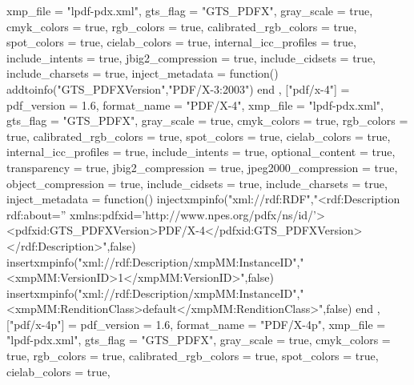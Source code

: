 {{            xmp_file                = "lpdf-pdx.xml",
            gts_flag                = "GTS_PDFX",
            gray_scale              = true,
            cmyk_colors             = true,
            rgb_colors              = true,
            calibrated_rgb_colors   = true,
            spot_colors             = true,
            cielab_colors           = true,
            internal_icc_profiles   = true,
            include_intents         = true,
            jbig2_compression       = true,
            include_cidsets         = true,
            include_charsets        = true,
            inject_metadata         = function()
                addtoinfo("GTS_PDFXVersion","PDF/X-3:2003")
            end
        },
        ["pdf/x-4"] = {
            pdf_version             = 1.6,
            format_name             = "PDF/X-4",
            xmp_file                = "lpdf-pdx.xml",
            gts_flag                = "GTS_PDFX",
            gray_scale              = true,
            cmyk_colors             = true,
            rgb_colors              = true,
            calibrated_rgb_colors   = true,
            spot_colors             = true,
            cielab_colors           = true,
            internal_icc_profiles   = true,
            include_intents         = true,
            optional_content        = true,
            transparency            = true,
            jbig2_compression       = true,
            jpeg2000_compression    = true,
            object_compression      = true,
            include_cidsets         = true,
            include_charsets        = true,
            inject_metadata         = function()
                injectxmpinfo("xml://rdf:RDF","<rdf:Description rdf:about='' xmlns:pdfxid='http://www.npes.org/pdfx/ns/id/'><pdfxid:GTS_PDFXVersion>PDF/X-4</pdfxid:GTS_PDFXVersion></rdf:Description>",false)
                insertxmpinfo("xml://rdf:Description/xmpMM:InstanceID","<xmpMM:VersionID>1</xmpMM:VersionID>",false)
                insertxmpinfo("xml://rdf:Description/xmpMM:InstanceID","<xmpMM:RenditionClass>default</xmpMM:RenditionClass>",false)
            end
        },
        ["pdf/x-4p"] = {
            pdf_version             = 1.6,
            format_name             = "PDF/X-4p",
            xmp_file                = "lpdf-pdx.xml",
            gts_flag                = "GTS_PDFX",
            gray_scale              = true,
            cmyk_colors             = true,
            rgb_colors              = true,
            calibrated_rgb_colors   = true,
            spot_colors             = true,
            cielab_colors           = true,
}}
